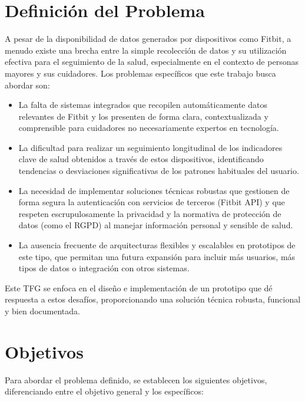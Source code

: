 \section{Definición del Problema}
\label{sec:intro_problema}

A pesar de la disponibilidad de datos generados por dispositivos como Fitbit\textsuperscript{\textregistered}, a menudo existe una brecha entre la simple recolección de datos y su utilización efectiva para el seguimiento de la salud, especialmente en el contexto de personas mayores y sus cuidadores. Los problemas específicos que este trabajo busca abordar son:

\begin{itemize}
    \item La falta de sistemas integrados que recopilen automáticamente datos relevantes de Fitbit\textsuperscript{\textregistered} y los presenten de forma clara, contextualizada y comprensible para cuidadores no necesariamente expertos en tecnología.
    \item La dificultad para realizar un seguimiento longitudinal de los indicadores clave de salud obtenidos a través de estos dispositivos, identificando tendencias o desviaciones significativas de los patrones habituales del usuario.
    \item La necesidad de implementar soluciones técnicas robustas que gestionen de forma segura la autenticación con servicios de terceros (Fitbit API) y que respeten escrupulosamente la privacidad y la normativa de protección de datos (como el RGPD) al manejar información personal y sensible de salud.
    \item La ausencia frecuente de arquitecturas flexibles y escalables en prototipos de este tipo, que permitan una futura expansión para incluir más usuarios, más tipos de datos o integración con otros sistemas.
\end{itemize}

Este TFG se enfoca en el diseño e implementación de un prototipo que dé respuesta a estos desafíos, proporcionando una solución técnica robusta, funcional y bien documentada.

\section{Objetivos}
\label{sec:intro_objetivos}

Para abordar el problema definido, se establecen los siguientes objetivos, diferenciando entre el objetivo general y los específicos:

